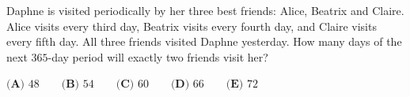 Daphne is visited periodically by her three best friends: Alice, Beatrix and Claire. Alice visits every third day, Beatrix visits every fourth day, and Claire visits every fifth day. All three friends visited Daphne yesterday. How many days of the next $365$-day period will exactly two friends visit her?

$\textbf{(A) }48\qquad\textbf{(B) }54\qquad\textbf{(C) }60\qquad\textbf{(D) }66\qquad\textbf{(E) }72$
